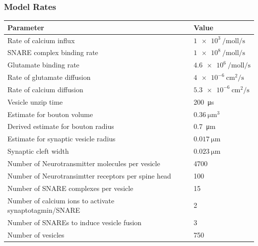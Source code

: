 \documentclass{beamer}
\begin{document}
\frame
{
\frametitle{Model Rates}
\begin{table}[H]
\tiny
\begin{tabular}{ll}
Parameter & Value \\ \hline
Rate of calcium influx   &  $\SI{1e3}{\per\mole\litre\per\second}$      \\
SNARE complex binding rate & $\SI{1e8}{\per\mol\litre\per\second}$ \\
Glutamate binding rate & $\SI{4.6e6}{\per\mol\litre\per\second}$ \\
Rate of glutamate diffusion & $\SI{4e-6}{\centi\metre\squared\per\second} $      \\
Rate of calcium diffusion & $\SI{5.3e-6}{\centi\metre\squared\per\second} $      \\
Vesicle unzip time & \SI{200}{\micro\second}  \\
Estimate for bouton volume&  $\SI{0.36}{\micro\meter\cubed}$\\ 
Derived estimate for bouton radius & \SI{0.7}{\micro\meter} \\
Estimate for synaptic vesicle radius & $\SI{0.017}{\micro\meter}$ \\ 
Synaptic cleft width &$\SI{0.023}{\micro\meter}$\\
Number of Neurotransmitter molecules per vesicle & 4700\\
Number of Neurotransimtter receptors per spine head & 100 \\
Number of SNARE complexes per vesicle & 15 \\ 
Number of calcium ions to activate synaptotagmin/SNARE & 2 \\
Number of SNAREs to induce vesicle fusion & 3 \\  
Number of vesicles & 750 \\
\end{tabular}
\end{table}
}


{}
\end{document}
